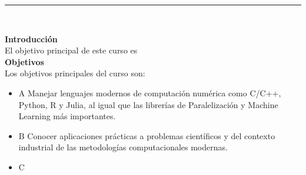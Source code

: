 \documentclass[letterpaper,10pt,onecolumn]{article}
\begin{document}




\noindent\rule{\textwidth}{1pt}\\[-0.1cm]

\addtocounter{mysection}{1}

\noindent\textbf{\large {} \quad Introducci\'on}\\[-0.2cm]


\noindent\normalsize El objetivo principal de este curso es 
\\[0.1cm]

\noindent\textbf{\large {} \quad Objetivos}\\[-0.2cm]

\noindent\normalsize Los objetivos principales del curso son:

\begin{itemize}

	\item A  Manejar lenguajes modernos de computación numérica como C/C++, Python, R y Julia, al igual que las librerías de Paralelización y Machine Learning más importantes. \\[-0.6cm]
	\item B  Conocer aplicaciones prácticas a problemas científicos y del contexto industrial de las metodologías computacionales modernas. \\[-0.6cm]
	\item C \\[-0.2cm] 
\end{itemize}
\end{document}
